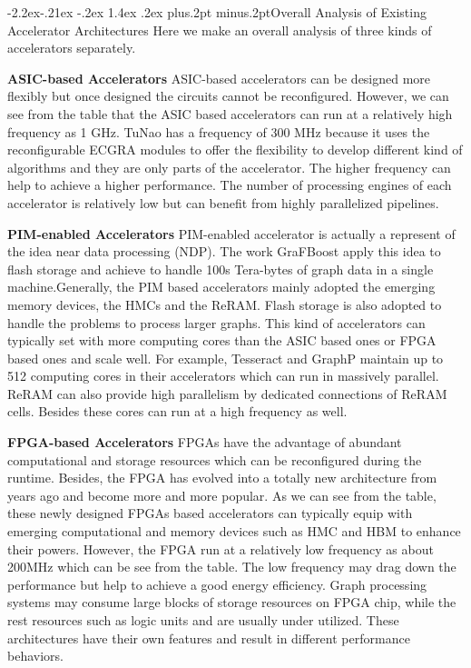 \documentclass[twoside]{article}
\makeatletter
\def\subsubsection{\@startsection{subsubsection}{3}{\z@}%
 {-2.2ex\@plus -.21ex \@minus -.2ex}%
 {1.4ex \@plus.2ex}
{\normalfont\normalsize\protect\baselineskip=12pt plus.2pt minus.2pt\sl}}
\makeatother
\begin{document}
\begin{multicols}{2}
\subsubsection{Overall Analysis of Existing Accelerator Architectures}
Here we make an overall analysis of three kinds of accelerators separately.

{\bf ASIC-based Accelerators} ASIC-based accelerators can be designed more flexibly but once designed the circuits cannot be reconfigured. However, we can see from the table that the ASIC based accelerators can run at a relatively high frequency  as 1 GHz. TuNao \cite{zhou2017tunao} has a frequency of 300 MHz because it uses the reconfigurable ECGRA modules to offer the flexibility to develop different kind of algorithms and they are only parts of the accelerator. The higher frequency can help to achieve a higher performance. The number of processing engines of each accelerator is relatively low but can benefit from highly parallelized pipelines.

{\bf PIM-enabled Accelerators} PIM-enabled accelerator is actually a represent of the idea near data processing (NDP). The work GraFBoost apply this idea to flash storage and achieve to handle 100s Tera-bytes of graph data in a single machine.Generally, the PIM based accelerators mainly adopted the emerging memory devices, the HMCs and the ReRAM. Flash storage is also adopted to handle the problems to process larger graphs. This kind of accelerators can typically set with more computing cores than the ASIC based ones or FPGA based ones and scale well. For example, Tesseract \cite{ahn2015tesseract} and GraphP \cite{zhang2018graphp} maintain up to 512 computing cores in their accelerators which can run in massively parallel. ReRAM \cite{song2018graphr} can also provide high parallelism by dedicated connections of ReRAM cells. Besides these cores can run at a high frequency as well.

{\bf FPGA-based Accelerators} FPGAs have the advantage of abundant computational and storage resources which can be reconfigured during the runtime. Besides, the FPGA has evolved into a totally new architecture from years ago and become more and more popular. As we can see from the table, these newly designed FPGAs based accelerators can typically equip with emerging computational and memory devices such as HMC and HBM \cite{Zhang2017fpgahmcbfs} to enhance their powers. However, the FPGA run at a relatively low frequency as about 200MHz which can be see from the table. The low frequency may drag down the performance but help to achieve a good energy efficiency. Graph processing systems may consume large blocks of storage resources on FPGA chip, while the rest resources such as logic units and are usually under utilized. These architectures have their own features and result in different performance behaviors. 


\end{multicols}
\end{document}

